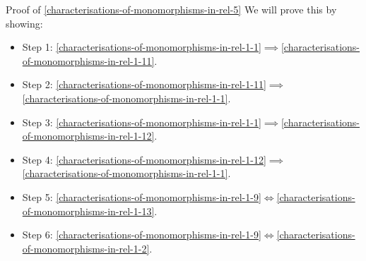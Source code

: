 \begin{Proof}{Proof of \cref{characterisations-of-monomorphisms-in-rel-5}}%
    We will prove this by showing:
    \begin{itemize}
        \item Step 1: \cref{characterisations-of-monomorphisms-in-rel-1-1}$\implies$\cref{characterisations-of-monomorphisms-in-rel-1-11}.
        \item Step 2: \cref{characterisations-of-monomorphisms-in-rel-1-11}$\implies$\cref{characterisations-of-monomorphisms-in-rel-1-1}.
        \item Step 3: \cref{characterisations-of-monomorphisms-in-rel-1-1}$\implies$\cref{characterisations-of-monomorphisms-in-rel-1-12}.
        \item Step 4: \cref{characterisations-of-monomorphisms-in-rel-1-12}$\implies$\cref{characterisations-of-monomorphisms-in-rel-1-1}.
        \item Step 5: \cref{characterisations-of-monomorphisms-in-rel-1-9}$\iff$\cref{characterisations-of-monomorphisms-in-rel-1-13}.
        \item Step 6: \cref{characterisations-of-monomorphisms-in-rel-1-9}$\iff$\cref{characterisations-of-monomorphisms-in-rel-1-2}.
    \end{itemize}


\end{Proof}
